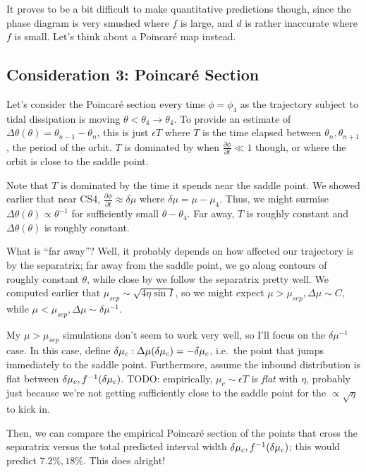 \documentclass[11pt,
        usenames, %
        dvipsnames %
    ]{article}
\newcommand*{\pd}[2]{\frac{\partial#1}{\partial#2}}
\DeclarePairedDelimiter\p{\lparen}{\rparen}
\begin{document}
It proves to be a bit difficult to make quantitative predictions though, since
the phase diagram is very smushed where $f$ is large, and $d$ is rather
inaccurate where $f$ is small. Let's think about a Poincar\'e map instead.

\subsection{Consideration 3: Poincar\'e Section}

Let's consider the Poincar\'e section every time $\phi = \phi_4$ as the
trajectory subject to tidal dissipation is moving $\theta < \theta_4 \to
\theta_4$. To provide an estimate of $\Delta \theta(\theta) = \theta_{n - 1} -
\theta_n$, this is just $\epsilon T$ where $T$ is the time elapsed between
$\theta_n, \theta_{n + 1}$, the period of the orbit. $T$ is dominated by when
$\pd{\phi}{t} \ll 1$ though, or where the orbit is close to the saddle point.

Note that $T$ is dominated by the time it spends near the saddle point. We
showed earlier that near CS4, $\pd{\phi}{t} \approx \delta \mu$ where $\delta
\mu = \mu - \mu_4$. Thus, we might surmise $\Delta \theta(\theta) \propto
\theta^{-1}$ for sufficiently small $\theta - \theta_4$. Far away, $T$ is
roughly constant and $\Delta \theta(\theta)$ is roughly constant.

What is ``far away''? Well, it probably depends on how affected our trajectory
is by the separatrix; far away from the saddle point, we go along contours of
roughly constant $\theta$, while close by we follow the separatrix pretty well.
We computed earlier that $\mu_{sep} \sim \sqrt{4\eta \sin I}$, so we might
expect $\mu > \mu_{sep}, \Delta \mu \sim C$, while $\mu < \mu_{sep}, \Delta
\mu \sim \delta \mu^{-1}$.

My $\mu > \mu_{sep}$ simulations don't seem to work very well, so I'll focus on
the $\delta \mu^{-1}$ case. In this case, define $\delta \mu_c: \Delta
\mu\p*{\delta \mu_c} = -\delta \mu_c$, i.e.\ the point that jumps immediately to
the saddle point. Furthermore, assume the inbound distribution is flat between
$\delta \mu_c, f^{-1}\p*{\delta \mu_c}$. TODO\@: empirically, $\mu_c \sim
\epsilon T$ is \emph{flat} with $\eta$, probably just because we're not getting
sufficiently close to the saddle point for the $\propto \sqrt{\eta}$ to kick in.

Then, we can compare the empirical Poincar\'e section of the points that cross
the separatrix versus the total predicted interval width $\delta \mu_c,
f^{-1}\p*{\delta \mu_c}$; this would predict $7.2\%, 18\%$. This does alright!
\end{document}
